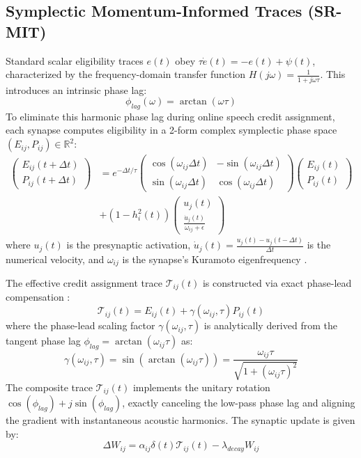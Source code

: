 \documentclass[10pt,twocolumn,letterpaper]{article}
\begin{document}
\subsection{Symplectic Momentum-Informed Traces (SR-MIT)}
Standard scalar eligibility traces $e(t)$ obey $\tau \dot{e}(t) = -e(t) + \psi(t)$, characterized by the frequency-domain transfer function $H(j\omega) = \frac{1}{1 + j\omega \tau}$. This introduces an intrinsic phase lag:
\begin{equation}
\phi_{lag}(\omega) = \arctan(\omega \tau)
\label{eq:phase_lag}
\end{equation}
To eliminate this harmonic phase lag during online speech credit assignment, each synapse computes eligibility in a 2-form complex symplectic phase space $(E_{ij}, P_{ij}) \in \mathbb{R}^2$:
\begin{align}
\begin{pmatrix} E_{ij}(t+\Delta t) \\ P_{ij}(t+\Delta t) \end{pmatrix} &= e^{-\Delta t/\tau} \begin{pmatrix} \cos(\omega_{ij} \Delta t) & -\sin(\omega_{ij} \Delta t) \\ \sin(\omega_{ij} \Delta t) & \cos(\omega_{ij} \Delta t) \end{pmatrix} \begin{pmatrix} E_{ij}(t) \\ P_{ij}(t) \end{pmatrix} \nonumber \\
&+ (1 - h_i^2(t)) \begin{pmatrix} u_j(t) \\ \frac{\dot{u}_j(t)}{\omega_{ij} + \epsilon} \end{pmatrix}
\label{eq:symplectic_step}
\end{align}
where $u_j(t)$ is the presynaptic activation, $\dot{u}_j(t) = \frac{u_j(t) - u_j(t-\Delta t)}{\Delta t}$ is the numerical velocity, and $\omega_{ij}$ is the synapse's Kuramoto eigenfrequency \cite{kuramoto1975self}.

The effective credit assignment trace $\mathcal{T}_{ij}(t)$ is constructed via exact phase-lead compensation \cite{schmid2024lead}:
\begin{equation}
\mathcal{T}_{ij}(t) = E_{ij}(t) + \gamma(\omega_{ij}, \tau) P_{ij}(t)
\label{eq:lead_trace}
\end{equation}
where the phase-lead scaling factor $\gamma(\omega_{ij}, \tau)$ is analytically derived from the tangent phase lag $\phi_{lag} = \arctan(\omega_{ij} \tau)$ as:
\begin{equation}
\gamma(\omega_{ij}, \tau) = \sin(\arctan(\omega_{ij} \tau)) = \frac{\omega_{ij} \tau}{\sqrt{1 + (\omega_{ij} \tau)^2}}
\label{eq:gamma_closed_form}
\end{equation}
The composite trace $\mathcal{T}_{ij}(t)$ implements the unitary rotation $\cos(\phi_{lag}) + j\sin(\phi_{lag})$, exactly canceling the low-pass phase lag and aligning the gradient with instantaneous acoustic harmonics. The synaptic update is given by:
\begin{equation}
\Delta W_{ij} = \alpha_{ij} \delta(t) \mathcal{T}_{ij}(t) - \lambda_{decay} W_{ij}
\label{eq:weight_update}
\end{equation}
\end{document}
